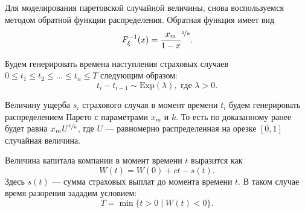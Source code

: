 Для моделирования паретовской случайной величины, снова воспользуемся методом обратной функции распределения. Обратная функция имеет вид
$$
        F_{\xi}^{-1}(x)
        =
        \frac{x_m}{1-x}^{\nicefrac{1}{k}}.
$$

Будем генерировать времена наступления страховых случаев $0 \leqslant t_1 \leqslant t_2 \leqslant \ldots \leqslant t_n \leqslant T$ следующим образом:
$$
        t_i - t_{i-1} \sim \mathrm{Exp}(\lambda), \mbox{ где } \lambda > 0.
$$

Величину ущерба $s_i$ страхового случая в момент времени $t_i$ будем генерировать распределением Парето с параметрами $x_m$ и $k$. То есть по доказанному ранее будет равна $x_mU^{\nicefrac{1}{k}}$, где $U$ --- равномерно распределенная на орезке $[0,1]$случайная величина.

Величина капитала компании в момент времени $t$ выразится как
$$
        W(t) = W(0) + ct - s(t).
$$
Здесь $s(t)$ --- сумма страховых выплат до момента  времени $t$. В таком случае время разорения зададим условием:
$$
        T = \min\{t>0\;|\;W(t) < 0\}.
$$

